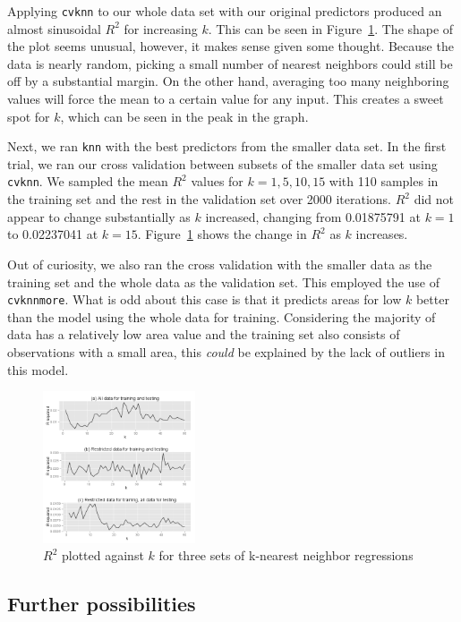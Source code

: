 \documentclass{article}
\begin{document}
Applying \verb=cvknn= to our whole data set with our original predictors
produced an almost sinusoidal $R^2$ for increasing $k$. This can be seen in
Figure~\ref{fig:r2knn}. The shape of the plot seems unusual, however, it
makes sense given some thought. Because the data is nearly random, picking a
small number of nearest neighbors could still be off by a substantial margin.
On the other hand, averaging too many neighboring values will force the mean to
a certain value for any input. This creates a sweet spot for $k$, which can be
seen in the peak in the graph.

Next, we ran \verb=knn= with the best predictors from the smaller data set. In
the first trial, we ran our cross validation between subsets of the smaller
data set using \verb=cvknn=. We sampled the mean $R^2$ values for $k=1,5,10,15$
with 110 samples in the training set and the rest in the validation set over
2000 iterations. $R^2$ did not appear to change substantially as $k$ increased,
changing from 0.01875791 at $k=1$ to 0.02237041 at $k=15$.
Figure~\ref{fig:r2knn} shows the change in $R^2$ as $k$ increases.

Out of curiosity, we also ran the cross validation with the smaller data as the
training set and the whole data as the validation set. This employed the use of
\verb=cvknnmore=. What is odd about this case is that it predicts areas for
low $k$ better than the model using the whole data for training. Considering
the majority of data has a relatively low area value and the training set also
consists of observations with a small area, this \emph{could} be explained by
the lack of outliers in this model.

\begin{figure}
  \centering
  \includegraphics[width=0.4\textwidth]{figures/r2knn.png}
  \caption{$R^2$ plotted against $k$ for three sets of k-nearest neighbor
  regressions}
  \label{fig:r2knn}
\end{figure}

\subsection{Further possibilities}
\end{document}
